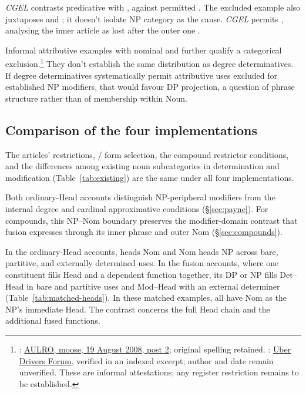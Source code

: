 \documentclass[12pt]{article}
\begin{document}
\textit{CGEL} contrasts predicative  with , against permitted  \citep[551--552]{huddleston2002}. The excluded example also juxtaposes  and ; it doesn't isolate NP category as the cause. \textit{CGEL} permits , analysing the inner article as lost after the outer one \citep[p.~552, n.~8]{huddleston2002}.

Informal attributive examples with nominal  and  further qualify a categorical exclusion.\footnote{: \href{https://www.aulro.com/afvb/motor-cycling/61858-my-track-day-phillip-island-motogp-track-post798794.html}{AULRO, moose, 19 August 2008, post 2}; original spelling retained. : \href{https://www.uberpeople.net/threads/let-s-play-would-you-have-taken-this-trip.395130/}{Uber Drivers Forum}, verified in an indexed excerpt; author and date remain unverified. These are informal attestations; any register restriction remains to be established.} They don't establish the same distribution as degree determinatives. If degree determinatives systematically permit attributive uses excluded for established NP modifiers, that would favour DP projection, a question of phrase structure rather than of membership within Noun.

\subsection{Comparison of the four implementations}\label{sec:costs}

The articles' restrictions, / form selection, the compound restrictor conditions, and the differences among existing noun subcategories in determination and modification (Table~\ref{tab:existing}) are the same under all four implementations.

Both ordinary-Head accounts distinguish NP-peripheral modifiers from the internal degree and cardinal approximative conditions (§\ref{sec:payne}). For compounds, this NP--Nom boundary preserves the modifier-domain contrast that fusion expresses through its inner phrase and outer Nom (§\ref{sec:compounds}).

In the ordinary-Head accounts,  heads Nom and Nom heads NP across bare, partitive, and externally determined uses. In the fusion accounts, where one constituent fills Head and a dependent function together, its DP or NP fills Det--Head in bare and partitive uses and Mod--Head with an external determiner (Table~\ref{tab:matched-heads}). In these matched examples, all have Nom as the NP's immediate Head. The contrast concerns the full Head chain and the additional fused functions.
\end{document}
